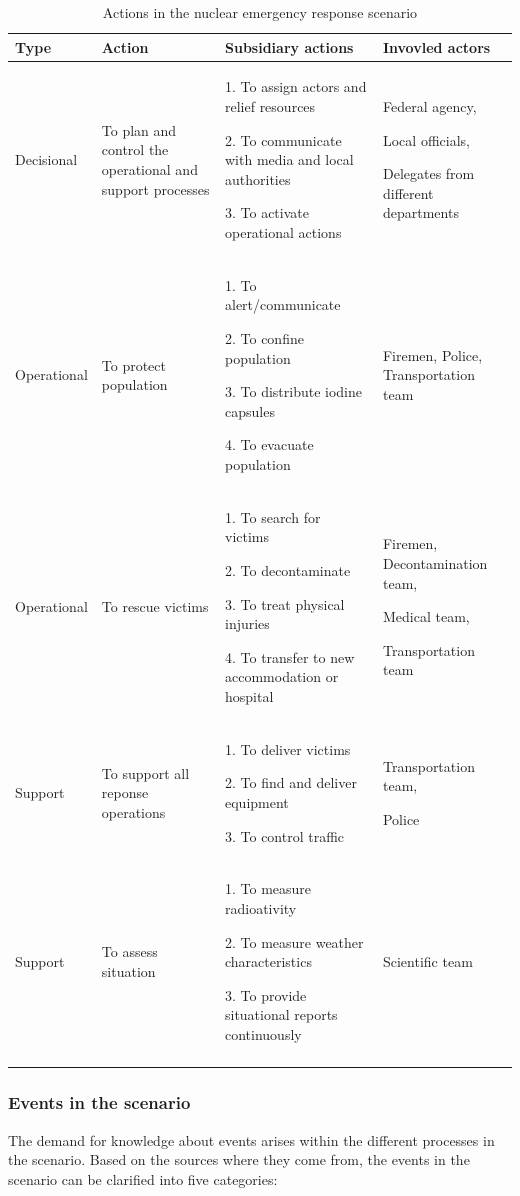 {\footnotesize
	\begin{longtable}{>{\raggedright}p{0.8in}>{\raggedright}p{1.7in}>{\raggedright}p{2in}>{\raggedright}p{1in}}
\toprule 
\textbf{Type} & \textbf{Action} & \textbf{Subsidiary actions} & \textbf{Invovled actors}\tabularnewline
\midrule 
Decisional & To plan and control the operational and support processes & 1. To assign actors and relief resources

2. To communicate with media and local authorities 

3. To activate operational actions & Federal agency,

Local officials,

Delegates from different departments\tabularnewline
\midrule 
Operational & To protect population & 1. To alert/communicate

2. To confine population

3. To distribute iodine capsules

4. To evacuate population & Firemen, Police, Transportation team\tabularnewline
\midrule 
Operational & To rescue victims & 1. To search for victims

2. To decontaminate

3. To treat physical injuries

4. To transfer to new accommodation or hospital & Firemen, Decontamination team,

Medical team,

Transportation team\tabularnewline
\midrule 
Support & To support all reponse operations & 1. To deliver victims

2. To find and deliver equipment

3. To control traffic & Transportation team, 

Police\tabularnewline
\midrule 
Support & To assess situation & 1. To measure radioativity

2. To measure weather characteristics

3. To provide situational reports continuously & Scientific team\tabularnewline
\bottomrule
\caption{Actions in the nuclear emergency response scenario}
\label{tab:actions_in_scenario}
\end{longtable}
}

\subsubsection{Events in the scenario} %
\label{ssub:events_in_the_scenario}
The demand for knowledge about events arises within the different processes in the scenario. Based on the sources where they come from, the events in the scenario can be clarified into five categories:

